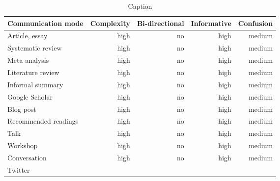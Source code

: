 \begin{table*}\centering
{}
\begin{tabular}{@{}lrrrr@{}}\toprule
Communication mode & Complexity & Bi-directional & Informative  & Confusion
\\\midrule
Article, essay & high & no & high & medium  \\
Systematic review & high & no & high & medium\\
Meta analysis & high & no & high & medium\\
Literature review & high & no & high & medium\\
Informal summary & high & no & high & medium\\
Google Scholar & high & no & high & medium\\
Blog post & high & no & high & medium\\
Recommended readings & high & no & high & medium\\
Talk & high & no & high & medium\\
Workshop & high & no & high & medium\\
Conversation & high & no & high & medium\\
Twitter \\


\bottomrule
\end{tabular}
\caption{Caption}
\end{table*}